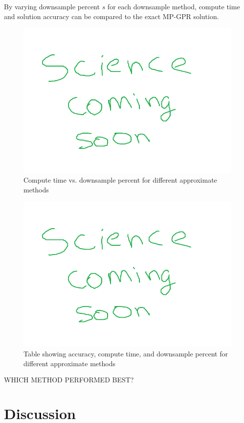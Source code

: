 By varying downsample percent $s$ for each downsample method, compute time and solution accuracy can be compared to the exact MP-GPR solution.

\begin{figure}[!ht]
    \begin{center}
       \includegraphics[width=.75\textwidth]{images/blank.png}
    \end{center}
    \caption{Compute time vs. downsample percent for different approximate methods} \label{fig:computeVSdownsample}
\end{figure}

\begin{figure}[!ht]
    \begin{center}
       \includegraphics[width=.75\textwidth]{images/blank.png}
    \end{center}
    \caption{Table showing accuracy, compute time, and downsample percent for different approximate methods} \label{fig:accuracy_time_downsample_money_chart}
\end{figure}

WHICH METHOD PERFORMED BEST?

\section{Discussion} \label{sec:discussion}

